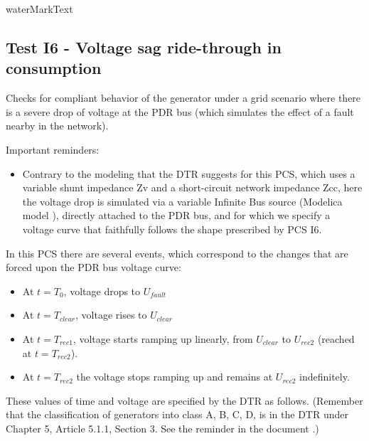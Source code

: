     {{ waterMarkText }}

    \renewcommand{\DTRPcs}{GridVoltageDip} %
    \renewcommand{\PCSname}{PCS_RTE-I16z3}
    \renewcommand{\OCname}{QzeroConsumption}


    \subsection{Test I6 - Voltage sag ride-through in consumption}

    Checks for compliant behavior of the generator under a grid scenario where there is a
    severe drop of voltage at the PDR bus (which simulates the effect of a fault
    nearby in the network).

    \GridCircuitZthree

    \noindent Important reminders:
    \begin{itemize}
        \item Contrary to the modeling that the DTR suggests for this PCS, which uses a
        variable shunt impedance Zv and a short-circuit network impedance Zcc, here
        the voltage drop is simulated via a variable Infinite Bus source (Modelica
        model ), directly attached to the PDR bus, and for
        which we specify a voltage curve that faithfully follows the shape prescribed
        by PCS I6.
    \end{itemize}

    In this PCS there are several events, which correspond to the changes that are
    forced upon the PDR bus voltage curve:
    \begin{itemize}
        \item At $t = T_{0}$, voltage drops to $U_{fault}$
        \item At $t = T_{clear}$, voltage rises to $U_{clear}$
        \item At $t = T_{rec1}$, voltage starts ramping up linearly, from $U_{clear}$ to
        $U_{rec2}$ (reached at $t = T_{rec2}$).
        \item At $t = T_{rec2}$ the voltage stops ramping up and remains at $U_{rec2}$
        indefinitely.
    \end{itemize}
    These values of time and voltage are specified by the DTR as follows. (Remember
    that the classification of generators into class A, B, C, D, is in the DTR under
    Chapter 5, Article 5.1.1, Section 3. See the reminder in the document
    .)

